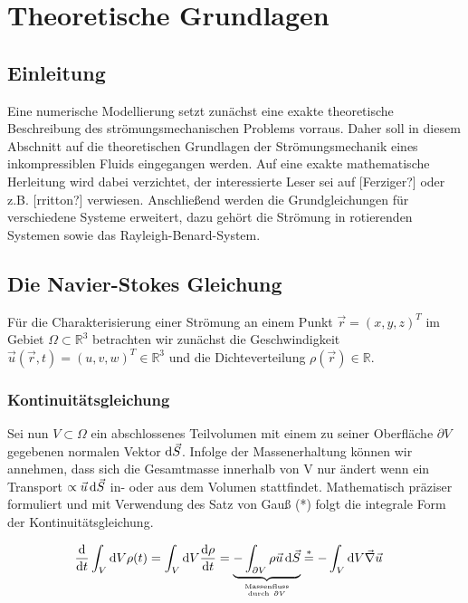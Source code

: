 \chapter{Theoretische Grundlagen}

\section{Einleitung}

Eine numerische Modellierung setzt zunächst eine exakte theoretische Beschreibung des strömungsmechanischen Problems vorraus.
Daher soll in diesem Abschnitt auf die theoretischen Grundlagen der Strömungsmechanik eines inkompressiblen Fluids eingegangen werden.
Auf eine exakte mathematische Herleitung wird dabei verzichtet, der interessierte Leser sei auf [Ferziger?] oder z.B. [rritton?] verwiesen.
Anschließend werden die Grundgleichungen für verschiedene Systeme erweitert, dazu gehört die Strömung in rotierenden Systemen sowie das Rayleigh-Benard-System.

\section{Die Navier-Stokes Gleichung}

Für die Charakterisierung einer Strömung an einem Punkt $\vec{r} = (x, y, z)^T$  im Gebiet $\Omega \subset \mathbb{R}^3$ betrachten wir zunächst
die Geschwindigkeit $\vec{u}(\vec{r}, t) = (u, v, w)^T \in \mathbb{R}^3$ und die Dichteverteilung $\rho(\vec{r}) \in \mathbb{R}$.

\subsection{Kontinuitätsgleichung}

Sei nun $V \subset \Omega$  ein abschlossenes Teilvolumen mit einem zu seiner Oberfläche $\partial V$ gegebenen normalen Vektor $\mathop{}\!\mathrm{d} \vec{S}$.
Infolge der Massenerhaltung können wir annehmen, dass sich die Gesamtmasse innerhalb von V nur ändert wenn ein
Transport $\propto \vec{u}\mathop{}\!\mathrm{d} \vec{S}$ in- oder aus dem Volumen stattfindet.
Mathematisch präziser formuliert und mit Verwendung des Satz von Gauß (*) folgt die integrale Form der Kontinuitätsgleichung.

\begin{align}
    \frac{\dif}{\dif t} \int_{V}\dif V \rho(t) =  \int_{V}\dif V \frac{\dif \rho}{\dif t}  &= \underbrace{-\int_{\partial V}
     \rho \vec{u}\dif \vec{S}}_{\mathrm{Massenfluss} \atop \mathrm{durch \ } \partial V} \overset{*}{=} -\int_V \dif V \vec{\nabla}\vec{u}
\end{align}

